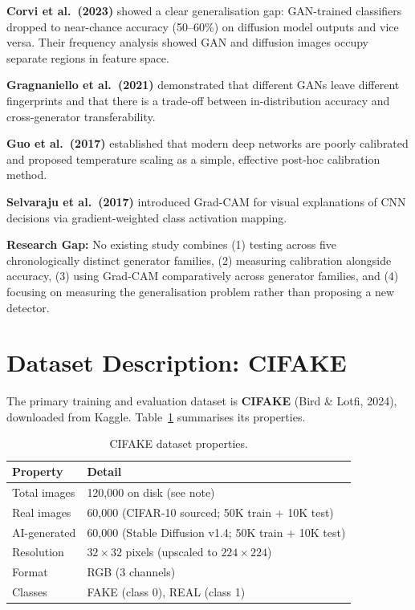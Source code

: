 \documentclass[12pt,a4paper]{article}
\begin{document}
\textbf{Corvi et al.\ (2023)} showed a clear generalisation gap: GAN-trained classifiers dropped to near-chance accuracy (50--60\%) on diffusion model outputs and vice versa. Their frequency analysis showed GAN and diffusion images occupy separate regions in feature space.

\textbf{Gragnaniello et al.\ (2021)} demonstrated that different GANs leave different fingerprints and that there is a trade-off between in-distribution accuracy and cross-generator transferability.

\textbf{Guo et al.\ (2017)} established that modern deep networks are poorly calibrated and proposed temperature scaling as a simple, effective post-hoc calibration method.

\textbf{Selvaraju et al.\ (2017)} introduced Grad-CAM for visual explanations of CNN decisions via gradient-weighted class activation mapping.

\medskip
\noindent\textbf{Research Gap:} No existing study combines (1) testing across five chronologically distinct generator families, (2) measuring calibration alongside accuracy, (3) using Grad-CAM comparatively across generator families, and (4) focusing on measuring the generalisation problem rather than proposing a new detector.

\section{Dataset Description: CIFAKE}

The primary training and evaluation dataset is \textbf{CIFAKE} (Bird \& Lotfi, 2024), downloaded from Kaggle. Table~\ref{tab:dataset} summarises its properties.

\begin{table}[H]
\centering
\caption{CIFAKE dataset properties.}
\label{tab:dataset}
\begin{tabular}{ll}
\toprule
\textbf{Property} & \textbf{Detail} \\
\midrule
Total images       & 120,000 on disk (see note)\\
Real images        & 60,000 (CIFAR-10 sourced; 50K train + 10K test) \\
AI-generated       & 60,000 (Stable Diffusion v1.4; 50K train + 10K test) \\
Resolution         & $32 \times 32$ pixels (upscaled to $224 \times 224$) \\
Format             & RGB (3 channels) \\
Classes            & FAKE (class 0), REAL (class 1) \\
\bottomrule
\end{tabular}
\end{table}
\end{document}
